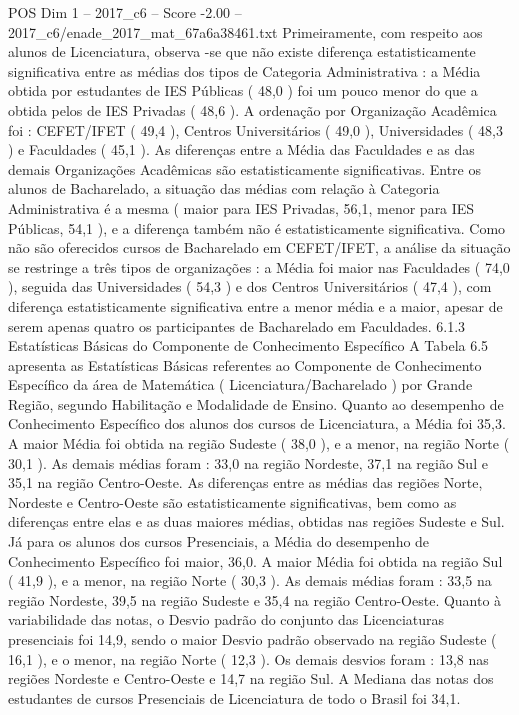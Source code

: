 \begin{textsample}{POS Dim 1 – 2017\_c6 – Score -2.00 – 2017\_c6/enade\_2017\_mat\_67a6a38461.txt}
Primeiramente, com respeito aos alunos de Licenciatura, observa -se que não existe diferença estatisticamente significativa entre as médias dos tipos de Categoria Administrativa : a Média obtida por estudantes de IES Públicas ( 48,0 ) foi um pouco menor do que a obtida pelos de IES Privadas ( 48,6 ).
A ordenação por Organização Acadêmica foi : CEFET/IFET ( 49,4 ), Centros Universitários ( 49,0 ), Universidades ( 48,3 ) e Faculdades ( 45,1 ).
As diferenças entre a Média das Faculdades e as das demais Organizações Acadêmicas são estatisticamente significativas.
Entre os alunos de Bacharelado, a situação das médias com relação à Categoria Administrativa é a mesma ( maior para IES Privadas, 56,1, menor para IES Públicas, 54,1 ), e a diferença também não é estatisticamente significativa.
Como não são oferecidos cursos de Bacharelado em CEFET/IFET, a análise da situação se restringe a três tipos de organizações : a Média foi maior nas Faculdades ( 74,0 ), seguida das Universidades ( 54,3 ) e dos Centros Universitários ( 47,4 ), com diferença estatisticamente significativa entre a menor média e a maior, apesar de serem apenas quatro os participantes de Bacharelado em Faculdades. 6.1.3 Estatísticas Básicas do Componente de Conhecimento Específico A Tabela 6.5 apresenta as Estatísticas Básicas referentes ao Componente de Conhecimento Específico da área de Matemática ( Licenciatura/Bacharelado ) por Grande Região, segundo Habilitação e Modalidade de Ensino.
Quanto ao desempenho de Conhecimento Específico dos alunos dos cursos de Licenciatura, a Média foi 35,3.
A maior Média foi obtida na região Sudeste ( 38,0 ), e a menor, na região Norte ( 30,1 ).
As demais médias foram : 33,0 na região Nordeste, 37,1 na região Sul e 35,1 na região Centro-Oeste.
As diferenças entre as médias das regiões Norte, Nordeste e Centro-Oeste são estatisticamente significativas, bem como as diferenças entre elas e as duas maiores médias, obtidas nas regiões Sudeste e Sul.
Já para os alunos dos cursos Presenciais, a Média do desempenho de Conhecimento Específico foi maior, 36,0.
A maior Média foi obtida na região Sul ( 41,9 ), e a menor, na região Norte ( 30,3 ).
As demais médias foram : 33,5 na região Nordeste, 39,5 na região Sudeste e 35,4 na região Centro-Oeste.
Quanto à variabilidade das notas, o Desvio padrão do conjunto das Licenciaturas presenciais foi 14,9, sendo o maior Desvio padrão observado na região Sudeste ( 16,1 ), e o menor, na região Norte ( 12,3 ).
Os demais desvios foram : 13,8 nas regiões Nordeste e Centro-Oeste e 14,7 na região Sul.
A Mediana das notas dos estudantes de cursos Presenciais de Licenciatura de todo o Brasil foi 34,1.

\end{textsample}
